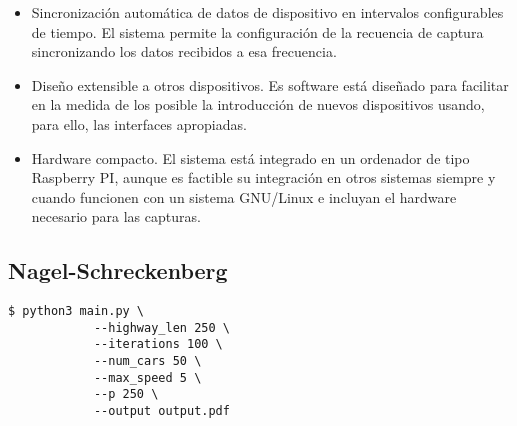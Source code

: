 \begin{itemize}
	\item Sincronización automática de datos de dispositivo en intervalos configurables de tiempo. El sistema permite la configuración de la recuencia de captura sincronizando los datos recibidos a esa frecuencia.
	\item Diseño extensible a otros dispositivos. Es software está diseñado para facilitar en la medida de los posible la introducción de nuevos dispositivos usando, para ello, las interfaces apropiadas.
	\item Hardware compacto. El sistema está integrado en un ordenador de tipo Raspberry PI, aunque es factible su integración en otros sistemas siempre y cuando funcionen con un sistema GNU/Linux e incluyan el hardware necesario para las capturas.
\end{itemize}

\subsection{Nagel-Schreckenberg}

\begin{lstlisting}[style=bash]
$ python3 main.py \
            --highway_len 250 \
            --iterations 100 \
            --num_cars 50 \
            --max_speed 5 \
            --p 250 \
            --output output.pdf
\end{lstlisting}